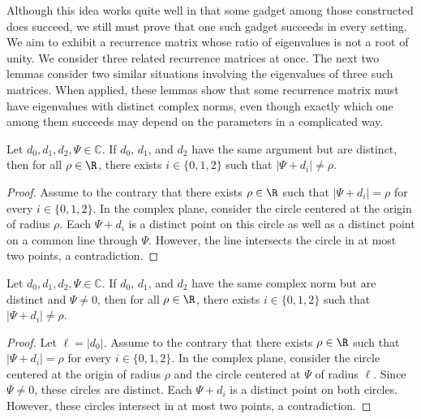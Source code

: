 \documentclass[11pt]{article}
\begin{document}
Although this idea works quite well in that some gadget among those constructed does succeed,
we still must prove that one such gadget succeeds in every setting.
We aim to exhibit a recurrence matrix whose ratio of eigenvalues is not a root of unity.
We consider three related recurrence matrices at once.
The next two lemmas consider two similar situations involving the eigenvalues of three such matrices.
When applied,
these lemmas show that some recurrence matrix must have eigenvalues with distinct complex norms,
even though exactly which one among them succeeds may depend on the parameters in a complicated way.

\begin{lemma} \label{lem:binary:norm:same_argument}
 Let $d_0, d_1, d_2, \Psi \in \mathbb{C}$.
 If $d_0$, $d_1$, and $d_2$ have the same argument but are distinct,
 then for all $\rho \in \R$, there exists $i \in \{0,1,2\}$ such that $|\Psi + d_i| \ne \rho$.
\end{lemma}

\begin{proof}
 Assume to the contrary that there exists $\rho \in \R$ such that $|\Psi + d_i| = \rho$ for every $i \in \{0,1,2\}$.
 In the complex plane,
 consider the circle centered at the origin of radius $\rho$.
 Each $\Psi + d_i$ is a distinct point on this circle as well as a distinct point on a common line through $\Psi$.
 However, the line intersects the circle in at most two points, a contradiction.
\end{proof}

\begin{lemma} \label{lem:binary:norm:same_norm}
 Let $d_0, d_1, d_2, \Psi \in \mathbb{C}$.
 If $d_0$, $d_1$, and $d_2$ have the same complex norm but are distinct and $\Psi \ne 0$,
 then for all $\rho \in \R$, there exists $i \in \{0,1,2\}$ such that $|\Psi + d_i| \ne \rho$.
\end{lemma}

\begin{proof}
 Let $\ell = |d_0|$.
 Assume to the contrary that there exists $\rho \in \R$ such that $|\Psi + d_i| = \rho$ for every $i \in \{0,1,2\}$.
 In the complex plane,
 consider the circle centered at the origin of radius $\rho$ and the circle centered at $\Psi$ of radius $\ell$.
 Since $\Psi \ne 0$, these circles are distinct.
 Each $\Psi + d_i$ is a distinct point on both circles.
 However, these circles intersect in at most two points, a contradiction.
\end{proof}
\end{document}
